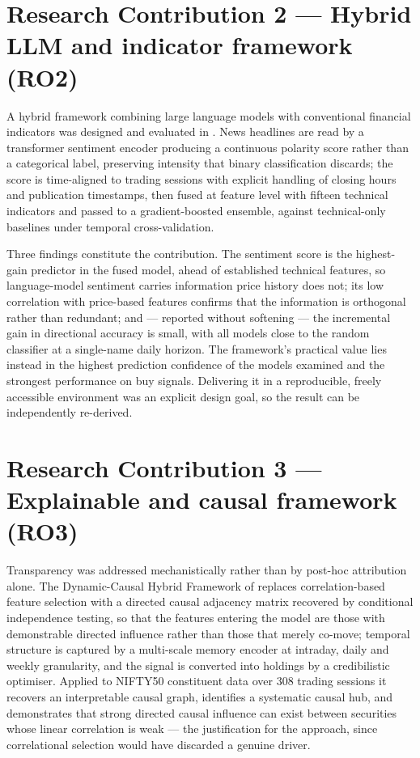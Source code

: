 \section{Research Contribution 2 --- Hybrid LLM and indicator framework (RO2)}

A hybrid framework combining large language models with conventional financial indicators was
designed and evaluated in . News headlines are read by a transformer sentiment
encoder producing a continuous polarity score rather than a categorical label, preserving
intensity that binary classification discards; the score is time-aligned to trading sessions
with explicit handling of closing hours and publication timestamps, then fused at feature level
with fifteen technical indicators and passed to a gradient-boosted ensemble, against
technical-only baselines under temporal cross-validation.

Three findings constitute the contribution. The sentiment score is the highest-gain predictor in
the fused model, ahead of established technical features, so language-model sentiment carries
information price history does not; its low correlation with price-based features confirms that
the information is orthogonal rather than redundant; and --- reported without softening --- the
incremental gain in directional accuracy is small, with all models close to the random
classifier at a single-name daily horizon. The framework's practical value lies instead in the
highest prediction confidence of the models examined and the strongest performance on buy
signals. Delivering it in a reproducible, freely accessible environment was an explicit design
goal, so the result can be independently re-derived.

\section{Research Contribution 3 --- Explainable and causal framework (RO3)}

Transparency was addressed mechanistically rather than by post-hoc attribution alone. The
Dynamic-Causal Hybrid Framework of  replaces correlation-based feature selection
with a directed causal adjacency matrix recovered by conditional independence testing, so that
the features entering the model are those with demonstrable directed influence rather than those
that merely co-move; temporal structure is captured by a multi-scale memory encoder at intraday,
daily and weekly granularity, and the signal is converted into holdings by a credibilistic
optimiser. Applied to NIFTY50 constituent data over 308 trading sessions it recovers an
interpretable causal graph, identifies a systematic causal hub, and demonstrates that strong
directed causal influence can exist between securities whose linear correlation is weak --- the
justification for the approach, since correlational selection would have discarded a genuine
driver.

